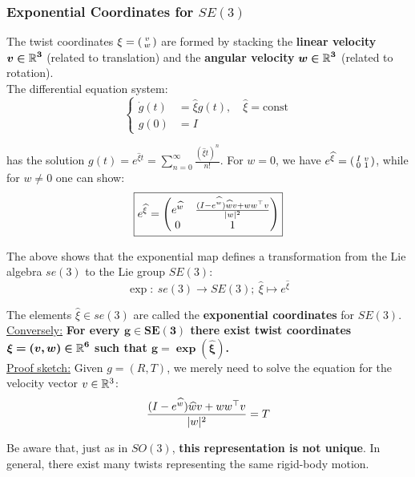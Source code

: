 \subsubsection{Exponential Coordinates for $SE(3)$}%
\label{ssub:exponential_coordinates_for_se_3_}

The twist coordinates $\xi = \left(\begin{smallmatrix} v\\w \end{smallmatrix} \right)$ are formed by stacking the
\textbf{linear velocity} $\bm{v \in \mathbb{R}^3}$ (related to translation) and the
\textbf{angular velocity} $\bm{w \in \mathbb{R}^3}$ (related to rotation).\\

The differential equation system:
	\[\left\{ \begin{aligned}
		\dot{g}(t) &= \widehat{\xi}g(t), \quad \widehat{\xi} = \text{const}\\
		g(0) &= I
	\end{aligned} \right.\]

has the solution $g(t) = e^{\widehat{\xi}t} = \sum_{n=0}^{\infty}
\frac{{(\widehat{\xi}t)}^n}{n!}$.
For $w = 0$, we have $e^{\widehat{\xi}} = \left(\begin{smallmatrix} I & v \\ 0 & 1 \end{smallmatrix} \right)$,
while for $w \ne 0$ one can show:
	\[\boxed{e^{\widehat{\xi}} = \begin{pmatrix}
		e^{\widehat{w}} & \frac{(I-e^{\widehat{w}})\widehat{w}v + ww^{\top}v}{|w|^2}\\
		0 & 1
	\end{pmatrix}}\]

The above shows that the exponential map defines a transformation from
the Lie algebra $se(3)$ to the Lie group $SE(3)$:
	\[ \exp:\ se(3) \rightarrow SE(3);\ \widehat{\xi} \mapsto e^{\widehat{\xi}}\]

The elements $\widehat{\xi} \in se(3)$ are called the
\textbf{exponential coordinates} for $SE(3)$.\\

\underline{Conversely:} \textbf{For every $\bm{g \in SE(3)}$ there exist
twist coordinates $\bm{\xi = (v,w) \in \mathbb{R}^6}$ such that $\bm{g=\exp(\widehat{\xi})}$.}\\

\underline{Proof sketch:} Given $g = (R,T)$, we merely need to solve the equation
for the velocity vector $v \in \mathbb{R}^3$:
	\[\frac{(I-e^{\widehat{w}})\widehat{w}v + ww^{\top}v}{|w|^2} = T\]


Be aware that, just as in $SO(3)$, \textbf{this representation is not unique}.
In general, there exist many twists representing the same rigid-body motion.


